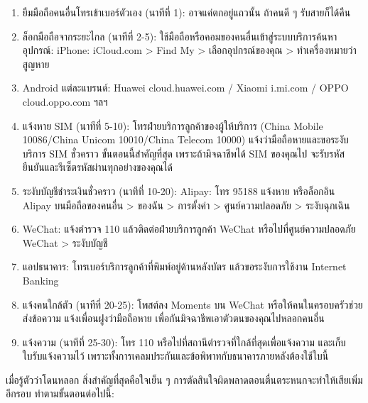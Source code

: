\begin{enumerate}
  \item ยืมมือถือคนอื่นโทรเข้าเบอร์ตัวเอง (นาทีที่ 1): อาจแค่ตกอยู่แถวนั้น ถ้าคนดี ๆ รับสายก็ได้คืน
  \item ล็อกมือถือจากระยะไกล (นาทีที่ 2-5): ใช้มือถือหรือคอมของคนอื่นเข้าสู่ระบบบริการค้นหาอุปกรณ์: iPhone: iCloud.com > Find My > เลือกอุปกรณ์ของคุณ > ทำเครื่องหมายว่าสูญหาย
  \item Android แต่ละแบรนด์: Huawei cloud.huawei.com / Xiaomi i.mi.com / OPPO cloud.oppo.com ฯลฯ
  \item แจ้งหาย SIM (นาทีที่ 5-10): โทรฝ่ายบริการลูกค้าของผู้ให้บริการ (China Mobile 10086/China Unicom 10010/China Telecom 10000) แจ้งว่ามือถือหายและขอระงับบริการ SIM ชั่วคราว ขั้นตอนนี้สำคัญที่สุด เพราะถ้ามิจฉาชีพได้ SIM ของคุณไป จะรับรหัสยืนยันและรีเซ็ตรหัสผ่านทุกอย่างของคุณได้
  \item ระงับบัญชีชำระเงินชั่วคราว (นาทีที่ 10-20): Alipay: โทร 95188 แจ้งหาย หรือล็อกอิน Alipay บนมือถือของคนอื่น > ของฉัน > การตั้งค่า > ศูนย์ความปลอดภัย > ระงับฉุกเฉิน
  \item WeChat: แจ้งตำรวจ 110 แล้วติดต่อฝ่ายบริการลูกค้า WeChat หรือไปที่ศูนย์ความปลอดภัย WeChat > ระงับบัญชี
  \item แอปธนาคาร: โทรเบอร์บริการลูกค้าที่พิมพ์อยู่ด้านหลังบัตร แล้วขอระงับการใช้งาน Internet Banking
  \item แจ้งคนใกล้ตัว (นาทีที่ 20-25): โพสต์ลง Moments บน WeChat หรือให้คนในครอบครัวช่วยส่งข้อความ แจ้งเพื่อนฝูงว่ามือถือหาย เพื่อกันมิจฉาชีพเอาตัวตนของคุณไปหลอกคนอื่น
  \item แจ้งความ (นาทีที่ 25-30): โทร 110 หรือไปที่สถานีตำรวจที่ใกล้ที่สุดเพื่อแจ้งความ และเก็บใบรับแจ้งความไว้ เพราะทั้งการเคลมประกันและข้อพิพาทกับธนาคารภายหลังต้องใช้ใบนี้
\end{enumerate}


เมื่อรู้ตัวว่าโดนหลอก สิ่งสำคัญที่สุดคือใจเย็น ๆ การตัดสินใจผิดพลาดตอนตื่นตระหนกจะทำให้เสียเพิ่มอีกรอบ ทำตามขั้นตอนต่อไปนี้:

